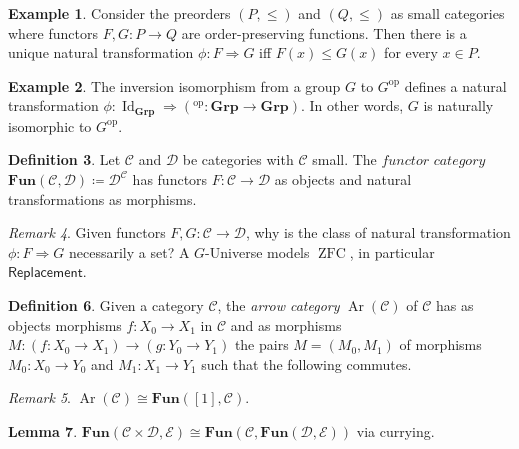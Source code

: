 \documentclass[10pt,letterpaper,cm]{nupset}
\theoremstyle{definition}
\newtheorem{definition}{Definition}
\newtheorem{exmp}[definition]{Example}
\theoremstyle{theorem}
\newtheorem{lemma}[definition]{Lemma}
\theoremstyle{remark}
\newtheorem{remark}[definition]{Remark}
\newcommand{\1}{\mathbf{1}}
\renewcommand{\c}{\mathscr{C}}
\renewcommand{\d}{\mathscr{D}}
\newcommand{\e}{\mathscr{E}}
\newcommand{\0}{\vec 0}
\DeclareMathOperator{\id}{Id}
\DeclareMathOperator{\op}{op}
\DeclareMathOperator{\ar}{Ar}
\DeclareMathOperator{\ZFC}{ZFC}
\begin{document}
\begin{exmp}
Consider the preorders $(P, \leq)$ and $(Q, \leq)$ as small categories where functors $F, G: P \to Q$ are order-preserving functions. Then there is a unique natural transformation $\phi: F \Rightarrow G$ iff $F(x) \leq G(x)$ for every $x\in P$.
\end{exmp}

\begin{exmp}\label{grp}
The inversion isomorphism from a group $G$ to $G^{\op}$ defines a natural transformation $\phi: \id_{\mathbf{Grp}} \Rightarrow (^{\op}: \mathbf{Grp} \to \mathbf{Grp})$. In other words, $G$ is naturally isomorphic to $G^{\op}$.
\end{exmp}

\begin{definition}
Let $\c$ and $\d$ be categories with $\c$ small. The $\textit{functor category}$ $\mathbf{Fun}(\c, \d)\coloneqq \d^\c$ has functors $F: \c \to \d$ as objects and natural transformations as morphisms. 
\end{definition}

\begin{remark}
Given functors $F, G: \c \to \d$, why is the class of natural transformation $\phi: F \Rightarrow G$ necessarily a set?
A $G$-Universe models $\ZFC$, in particular $\mathsf{Replacement}$.
\end{remark}

\begin{definition}
Given a category $\c$, the \textit{arrow category} $\ar(\c)$ of $\c$ has as objects morphisms $f: X_0 \to X_1$ in $\c$ and as morphisms $M: (f: X_0 \to X_1) \to (g: Y_0 \to Y_1)$ the pairs $M=(M_0, M_1)$ of morphisms $M_0 : X_0 \to Y_0$ and $M_1 : X_1 \to Y_1$ such that the following commutes. 

\begin{center}
\end{center}

\begin{remark}$\ar(\c) \cong \mathbf{Fun}([1], \c)$.
\end{remark}
\end{definition}

\begin{lemma}
$\mathbf{Fun}(\c \times \d, \e) \cong \mathbf{Fun}(\c, \mathbf{Fun}( \d, \e))$ via currying. 
\end{lemma}
\end{document}
